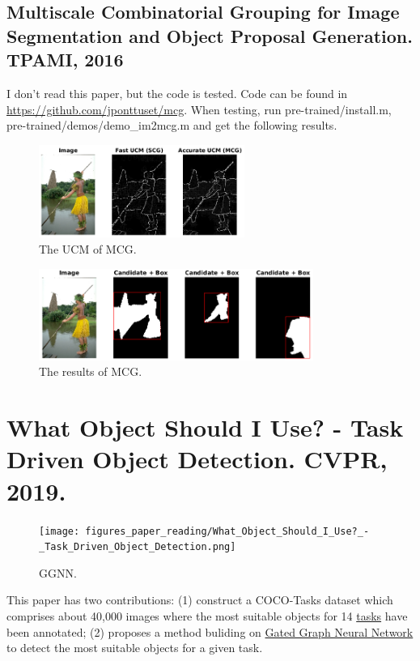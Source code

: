 \documentclass[10pt,onecolumn]{book}
\begin{document}
\subsection{Multiscale Combinatorial Grouping for Image Segmentation and Object Proposal Generation. TPAMI, 2016}
I don't read this paper, but the code is tested. Code can be found in \url{https://github.com/jponttuset/mcg}. When testing, run pre-trained/install.m, pre-trained/demos/demo\_im2mcg.m and get the following results.
\begin{figure}[h]
\centering
\includegraphics[width=0.6\textwidth]{figures_paper_reading/MCG_UCM.png}
\caption{The UCM of MCG.}
\label{fig}
\end{figure}

\begin{figure}[h]
\centering
\includegraphics[width=0.8\textwidth]{figures_paper_reading/MCG.png}
\caption{The results of MCG.}
\label{fig}
\end{figure}

\section{What Object Should I Use? - Task Driven Object Detection. CVPR, 2019.}
\begin{figure}[h]
\centering
\texttt{[image: figures\_paper\_reading/What\_Object\_Should\_I\_Use?\_-\_Task\_Driven\_Object\_Detection.png]}
\caption{GGNN.}
\label{fig}
\end{figure}

This paper has two contributions:
(1) construct a COCO-Tasks dataset which comprises about 40,000 images where the most suitable objects for 14 \uline{tasks} have been annotated;
(2) proposes a method buliding on \uline{Gated Graph Neural Network} to detect the most suitable objects for a given task. 
\end{document}
